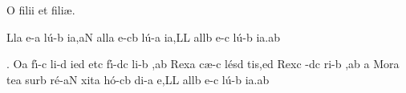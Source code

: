 \beginhymn O filii et fili\ae .

\Internote
\nosolesmescustos
\initiumgregorianum
{}%
\sgn {}Ll\punctum a\egn
\sgn {}e-\punctum a\egn
\sgn l{\'u}-\punctum b\egn
\sgn ia,\clivis aN\egn
\spatium
\sgn {}a{ll}\punctum a\egn
\sgn {}e-\clivis cb\egn
\sgn l{\'u}-\punctum a\egn
\sgn ia,\punctum L\augmentum L\egn
\spatium
\divisiominor
\spatium
\sgn {}a{ll}\punctum b\egn
\sgn {}e-\punctum c\egn
\sgn l{\'u}-\punctum b\egn
\sgn ia.\punctum a\augmentum b\egn
\spatium
\Finisgregoriana

\smallskip

\Internote
\nosolesmescustos
\initiumgregorianum
\sgn {}{\oldstyle 1\rm}.\egn
\spatium
\sgn {}O{}\punctum a\egn
\spatium
\sgn f{\'\i}-\punctum c\egn
\sgn li-\punctum d\egn
\sgn {}i{}\clivis ed\egn
\spatium
\sgn {}et\punctum c\egn
\spatium
\sgn f{\'\i}-\clivis dc\egn
\sgn li-\punctum b\egn
\sgn {}{\ae},\punctum a\augmentum b\egn
\spatium
\divisiominor
\spatium
\sgn Rex\punctum a\egn
\spatium
\sgn c{\ae}-\punctum c\egn
\sgn l{\'e}s\punctum d\egn
\sgn ti{s,}\clivis ed\egn
\spatium
\sgn Rex\punctum c\egn
\spatium
{}-\clivis dc\egn
\sgn ri-\punctum b\egn
\sgn {}{\ae},\punctum a\augmentum b\egn
\spatium
\divisiominor
\spatium
\custos a\lineaproxima
\sgn M{o}r\punctum a\egn
\sgn te{}\punctum a\egn
\spatium
\sgn sur\punctum b\egn
\sgn r{\'e}-\clivis aN\egn
\sgn xit\punctum a\egn
\spatium
\sgn h{\'o}-\clivis cb\egn
\sgn di-\punctum a\egn
\sgn {}e,\punctum L\augmentum L\egn
\spatium
\divisiominor
\spatium
\sgn {}a{ll}\punctum b\egn
\sgn {}e-\punctum c\egn
\sgn l{\'u}-\punctum b\egn
\sgn ia.\punctum a\augmentum b\egn
\spatium
\Finisgregoriana

\medskip

\beginlyrics

